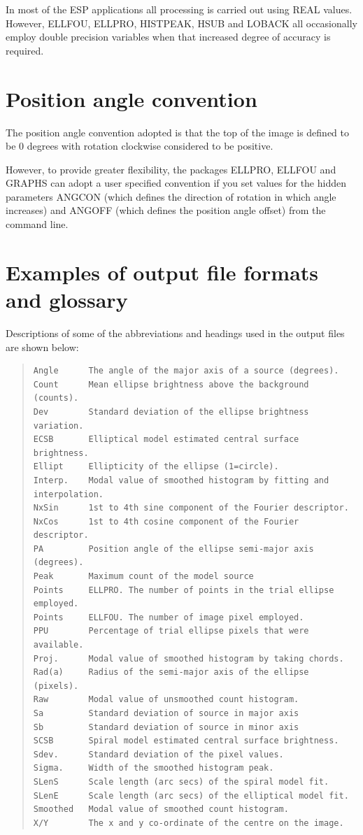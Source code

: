 \documentclass[twoside,11pt]{article}
\newenvironment{myquote}{\begin{quote}\begin{small}}{\end{small}\end{quote}}
\begin{document}
In most of the ESP applications all processing is carried out using REAL values.
However, ELLFOU, ELLPRO, HISTPEAK, HSUB and LOBACK all occasionally employ
double precision variables when that increased degree of accuracy is required.

\section{Position angle convention}

The position angle convention adopted is that the top of the image is 
defined to be 0 degrees with rotation clockwise considered to
be positive. 

However, to provide greater flexibility, the packages ELLPRO, ELLFOU and
GRAPHS can adopt a user specified convention if you set values for the
hidden parameters ANGCON (which defines the direction of rotation
in which angle increases) and ANGOFF (which defines the position angle offset)
from the command line.   

\newpage
\section{Examples of output file formats and glossary}
\label{app:outputfiles}

Descriptions of some of the abbreviations and headings used in the output files
are shown below:

\begin{myquote}
\begin{verbatim}
Angle      The angle of the major axis of a source (degrees).
Count      Mean ellipse brightness above the background (counts). 
Dev        Standard deviation of the ellipse brightness variation.
ECSB       Elliptical model estimated central surface brightness.
Ellipt     Ellipticity of the ellipse (1=circle).  
Interp.    Modal value of smoothed histogram by fitting and interpolation.
NxSin      1st to 4th sine component of the Fourier descriptor.
NxCos      1st to 4th cosine component of the Fourier descriptor.
PA         Position angle of the ellipse semi-major axis (degrees).
Peak       Maximum count of the model source
Points     ELLPRO. The number of points in the trial ellipse employed.
Points     ELLFOU. The number of image pixel employed.
PPU        Percentage of trial ellipse pixels that were available.  
Proj.      Modal value of smoothed histogram by taking chords.
Rad(a)     Radius of the semi-major axis of the ellipse (pixels).  
Raw        Modal value of unsmoothed count histogram.
Sa         Standard deviation of source in major axis
Sb         Standard deviation of source in minor axis
SCSB       Spiral model estimated central surface brightness.
Sdev.      Standard deviation of the pixel values.
Sigma.     Width of the smoothed histogram peak.
SLenS      Scale length (arc secs) of the spiral model fit.
SLenE      Scale length (arc secs) of the elliptical model fit.
Smoothed   Modal value of smoothed count histogram.
X/Y        The x and y co-ordinate of the centre on the image.    
\end{verbatim}
\end{myquote}
\end{document}
